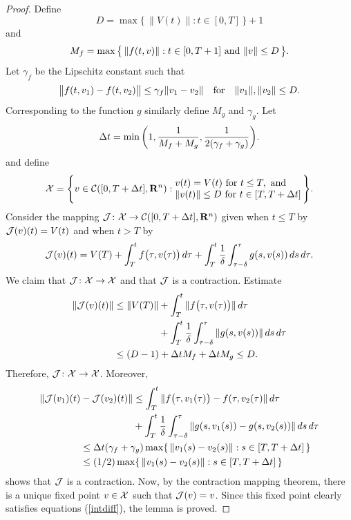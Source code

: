 \documentclass[master,tocprelim,12pt]{unrthesis}
\theoremstyle{definition}
\newcommand{\R}{{\bf R}}
\def\words#1{\quad\hbox{#1}\quad}
\numberwithin{equation}{chapter}
\begin{document}
\begin{manuscript}
\begin{proof}
Define 
$$D=\max\big\{\, \| V(t)\| : t\in[0,T]\,\big\}+1$$
and
$$M_f=\max\big\{\, \|f(t,v)\| : t\in[0,T+1]\hbox{ and }\|v\|\le D\,\big\}.$$
Let $\gamma_f$ be the Lipschitz constant such that
$$
	\big\|f(t,v_1)-f(t,v_2)\big\|\le \gamma_f \|v_1-v_2\|
\words{for} \|v_1\|,\|v_2\|\le D.
$$
Corresponding to the function $g$
similarly define $M_g$ and $\gamma_g$.
Let
\begin{equation}\label{sizeofh}
	\Delta t=\min\bigg(1,{1\over M_f+M_g},{1\over 2(\gamma_f+\gamma_g)}\bigg).
\end{equation}
and define
\begin{align}
    {\cal X}=\Bigg\{
        v\in {\cal C}([0,T+\Delta t],\R^n):
        \begin{matrix}v(t)=V(t)\hbox{ for }t\le T,\hbox{ and }\hfill\\
        \|v(t)\| \le D\hbox{ for }t\in[T,T+\Delta t]\end{matrix}\,\Bigg\}.
\end{align}
Consider the mapping ${\cal J}\colon{\cal X}\to {\cal C}([0,T+\Delta t],\R^n)$ 
given when $t\le T$ by ${\cal J}(v)(t)= V(t)$ and when $t> T$ by
$$
	{\cal J}(v)(t)= V(T)+\int_T^t f\big(\tau,v(\tau)\big)\,d\tau
		+ \int_T^t{1\over\delta}\int_{\tau-\delta}^\tau g(s,v(s))\,ds\,d\tau.
$$
We claim that ${\cal J}\colon{\cal X}\to{\cal X}$ and
that ${\cal J}$ is a contraction.
Estimate
\begin{align*}
	\|{\cal J}(v)(t)\|
	&
	\le \| V(T)\|+
	\int_T^t \|f\big(\tau,v(\tau)\big)\|\,d\tau\\
	&\phantom{{}\le \| V(T)\|}
		+ \int_T^t{1\over\delta}\int_{\tau-\delta}^\tau 
			\|g(s,v(s))\|\,ds\,d\tau\\
	&\le (D-1) + \Delta t M_f +\Delta t M_g \le D.
        \end{align*}
Therefore, ${\cal J}\colon{\cal X}\to{\cal X}$.  Moreover,
\begin{align*}
	\|{\cal J}(v_1)(t)&-{\cal J}(v_2)(t)\|
		\le
	\int_T^t \|f\big(\tau,v_1(\tau)\big)-f(\tau,v_2(\tau)\|\,d\tau\\
		&
\phantom{{}-{\cal J}(v_2)(t)\|}
+ \int_T^t{1\over\delta}\int_{\tau-\delta}^\tau 
			\|g(s,v_1(s))-g(s,v_2(s))\|\,ds\,d\tau\\
	&\le \Delta t(\gamma_f+\gamma_g) \max \{\,\|v_1(s)-v_2(s)\|: s\in [T,T+\Delta t]\,\}\\
	&\le (1/2) \max \{\,\|v_1(s)-v_2(s)\|: s\in [T,T+\Delta t]\,\}
        \end{align*}
shows that ${\cal J}$ is a contraction.
Now, by the contraction mapping theorem, there is a unique fixed point
$v\in {\cal X}$ such that ${\cal J}(v)=v$.  
Since this fixed point clearly satisfies equations (\ref{intdiff}),
the lemma is proved.
\end{proof}


\end{manuscript}
\end{document}

